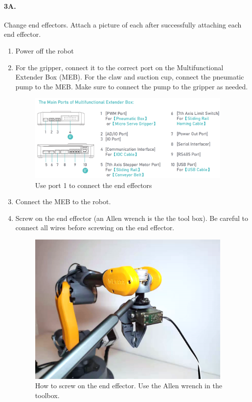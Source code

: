 \paragraph{3A.} Change end effectors. Attach a picture of each after successfully attaching each end effector.
\begin{enumerate} %
    \item Power off the robot
    \item For the gripper, connect it to the correct port on the Multifunctional Extender Box (MEB). For the claw and suction cup, connect the pneumatic pump to the MEB.
    Make sure to connect the pump to the gripper as needed.
\begin{figure}[H]
  \centering
  \vspace*{-0.0 in}
  \includegraphics[width=10cm]{image/endeffectors.png}
  \caption*{Use port 1 to connect the end effectors}
  \end{figure}
    \item Connect the MEB to the robot.
    \item Screw on the end effector (an Allen wrench is the the tool box).
    Be careful to connect all wires before screwing on the end effector.
    \begin{figure}[H]
   \centering
    \vspace*{-0.0 in}
    \includegraphics[width=10cm]{image/screwingendeffector.png}
    \caption*{How to screw on the end effector. Use the Allen wrench in the toolbox.}
\end{figure}
\end{enumerate}

